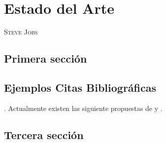\chapter{Estado del Arte}
              {\textsc{Steve Jobs}}

\section{Primera sección }
\lipsum[1]

\section{Ejemplos Citas Bibliográficas}
\lipsum[3-4].
Actualmente existen las siguiente propuestas de \cite{lopez2013impacto} y \cite{orduna2016revolucion}.

\section{Tercera sección}
\lipsum[5-6]
